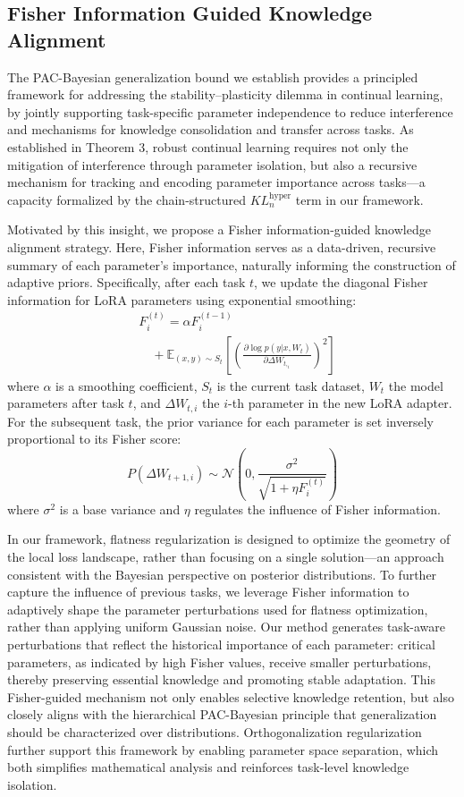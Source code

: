 \documentclass[letterpaper]{article} %
\begin{document}
\subsection{Fisher Information Guided Knowledge Alignment}


The PAC-Bayesian generalization bound we establish provides a principled framework for addressing the stability–plasticity dilemma in continual learning, by jointly supporting task-specific parameter independence to reduce interference and mechanisms for knowledge consolidation and transfer across tasks. As established in Theorem 3, robust continual learning requires not only the mitigation of interference through parameter isolation, but also a recursive mechanism for tracking and encoding parameter importance across tasks—a capacity formalized by the chain-structured $KL^{\text{hyper}}_n$ term in our framework.

Motivated by this insight, we propose a Fisher information-guided knowledge alignment strategy. Here, Fisher information serves as a data-driven, recursive summary of each parameter's importance, naturally informing the construction of adaptive priors. Specifically, after each task $t$, we update the diagonal Fisher information for LoRA parameters using exponential smoothing:
$$
\begin{aligned}
  &F^{(t)}_i = \alpha F^{(t-1)}_i  \\
  & \quad+ \mathbb{E}_{(x, y) \sim S_t} \left[ \left( \frac{\partial \log p(y|x, W_{t})}{\partial \Delta W_{t,_i}} \right)^2 \right] 
\end{aligned}
$$
where $\alpha$ is a smoothing coefficient, $S_t$ is the current task dataset, $W_t$ the model parameters after task $t$, and $\Delta W_{t,i}$ the $i$-th parameter in the new LoRA adapter. For the subsequent task, the prior variance for each parameter is set inversely proportional to its Fisher score:
$$
P(\Delta W_{t+1,i}) \sim \mathcal{N}\left(0, \frac{\sigma^2}{\sqrt{1+\eta F^{(t)}_i}}\right)
$$
where $\sigma^2$ is a base variance and $\eta$ regulates the influence of Fisher information.

In our framework, flatness regularization is designed to optimize the geometry of the local loss landscape, rather than focusing on a single solution—an approach consistent with the Bayesian perspective on posterior distributions. To further capture the influence of previous tasks, we leverage Fisher information to adaptively shape the parameter perturbations used for flatness optimization, rather than applying uniform Gaussian noise. Our method generates task-aware perturbations that reflect the historical importance of each parameter: critical parameters, as indicated by high Fisher values, receive smaller perturbations, thereby preserving essential knowledge and promoting stable adaptation. This Fisher-guided mechanism not only enables selective knowledge retention, but also closely aligns with the hierarchical PAC-Bayesian principle that generalization should be characterized over distributions. Orthogonalization regularization further support this framework by enabling parameter space separation, which both simplifies mathematical analysis and reinforces task-level knowledge isolation.
\end{document}
